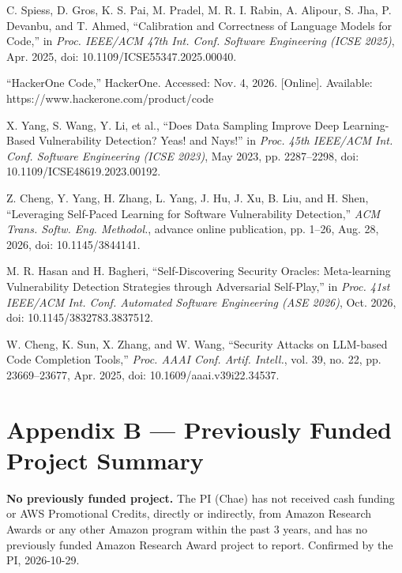 \documentclass[11pt]{article}
\begin{document}
\begin{enumerate}[leftmargin=2.2em, itemsep=0.3ex, topsep=2pt, label={[\arabic*]}]
\item C. Spiess, D. Gros, K. S. Pai, M. Pradel, M. R. I. Rabin, A. Alipour, S. Jha, P. Devanbu, and T. Ahmed, ``Calibration and Correctness of Language Models for Code,'' in \emph{Proc. IEEE/ACM 47th Int. Conf. Software Engineering (ICSE 2025)}, Apr. 2025, doi: 10.1109/ICSE55347.2025.00040.
\item ``HackerOne Code,'' HackerOne. Accessed: Nov. 4, 2026. [Online]. Available: https://www.hackerone.com/product/code
\item X. Yang, S. Wang, Y. Li, et al., ``Does Data Sampling Improve Deep Learning-Based Vulnerability Detection? Yeas! and Nays!'' in \emph{Proc. 45th IEEE/ACM Int. Conf. Software Engineering (ICSE 2023)}, May 2023, pp. 2287--2298, doi: 10.1109/ICSE48619.2023.00192.
\item Z. Cheng, Y. Yang, H. Zhang, L. Yang, J. Hu, J. Xu, B. Liu, and H. Shen, ``Leveraging Self-Paced Learning for Software Vulnerability Detection,'' \emph{ACM Trans. Softw. Eng. Methodol.}, advance online publication, pp. 1--26, Aug. 28, 2026, doi: 10.1145/3844141.
\item M. R. Hasan and H. Bagheri, ``Self-Discovering Security Oracles: Meta-learning Vulnerability Detection Strategies through Adversarial Self-Play,'' in \emph{Proc. 41st IEEE/ACM Int. Conf. Automated Software Engineering (ASE 2026)}, Oct. 2026, doi: 10.1145/3832783.3837512.
\item W. Cheng, K. Sun, X. Zhang, and W. Wang, ``Security Attacks on LLM-based Code Completion Tools,'' \emph{Proc. AAAI Conf. Artif. Intell.}, vol. 39, no. 22, pp. 23669--23677, Apr. 2025, doi: 10.1609/aaai.v39i22.34537.
\end{enumerate}

\clearpage
\section*{Appendix B --- Previously Funded Project Summary}

\textbf{No previously funded project.} The PI (Chae) has not received cash funding or AWS Promotional Credits, directly or indirectly, from Amazon Research Awards or any other Amazon program within the past 3 years, and has no previously funded Amazon Research Award project to report. Confirmed by the PI, 2026-10-29.
\end{document}
